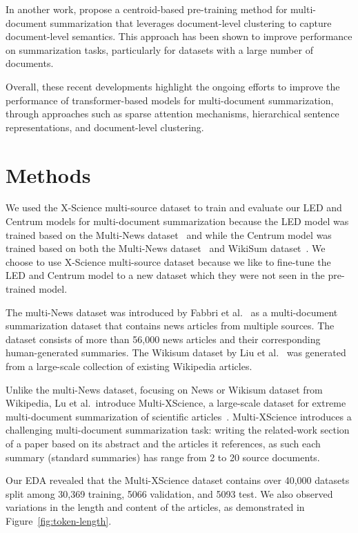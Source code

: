 \documentclass[12pt, twocolumn]{article}
\numberwithin{equation}{section}
\begin{document}
In another work, \cite{puduppully2022multidocument} propose a centroid-based pre-training method for multi-document summarization that leverages document-level clustering to capture document-level semantics. This approach has been shown to improve performance on summarization tasks, particularly for datasets with a large number of documents.

Overall, these recent developments highlight the ongoing efforts to improve the performance of transformer-based models for multi-document summarization, through approaches such as sparse attention mechanisms, hierarchical sentence representations, and document-level clustering.

\section{Methods}
\label{sec:methods}

We used the X-Science multi-source dataset \cite{lu-etal-2020-multi-xscience} to train and evaluate our LED and Centrum models for multi-document summarization because the LED model was trained based on the Multi-News dataset~\cite{fabbri-etal-2019-multi} and while the Centrum model was trained based on both the Multi-News dataset~\cite{fabbri-etal-2019-multi} and WikiSum dataset~\cite{liu2018generating}. We choose to use X-Science multi-source dataset because we like to fine-tune the LED and Centrum model to a new dataset which they were not seen in the pre-trained model.

The multi-News dataset was introduced by Fabbri et al.~\cite{fabbri-etal-2019-multi} as a multi-document summarization dataset that contains news articles from multiple sources. The dataset consists of more than 56,000 news articles and their corresponding human-generated summaries. The Wikisum dataset by Liu et al.~\cite{liu2018generating} was generated from a large-scale collection of existing Wikipedia articles.

Unlike the multi-News dataset, focusing on News or Wikisum dataset from Wikipedia, Lu et al.~introduce Multi-XScience, a large-scale dataset for extreme multi-document summarization of scientific articles~\cite{lu-etal-2020-multi-xscience}. Multi-XScience introduces a challenging multi-document summarization task: writing the related-work section of a paper based on its abstract and the articles it references, as such each summary (standard summaries) has range from 2 to 20 source documents.

Our EDA revealed that the Multi-XScience dataset contains over 40,000 datasets split among 30,369 training, 5066 validation, and 5093 test.  We also observed variations in the length and content of the articles, as demonstrated in Figure~\ref{fig:token-length}.
\end{document}
